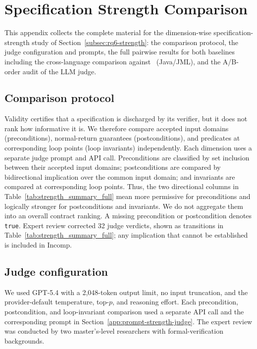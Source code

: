 \section{{Specification Strength Comparison}}
\label{app:strength}

{This appendix collects the complete material for the dimension-wise specification-strength study of Section~\ref{subsec:rq6-strength}: the comparison protocol, the judge configuration and prompts, the full pairwise results for both baselines including the cross-language comparison against \specgen\ (Java/JML), and the A/B-order audit of the LLM judge.}

\subsection{{Comparison protocol}}
\label{app:strength-protocol}

{Validity certifies that a specification is discharged by its verifier, but it does not rank how informative it is. We therefore compare accepted input domains (preconditions), normal-return guarantees (postconditions), and predicates at corresponding loop points (loop invariants) independently. Each dimension uses a separate judge prompt and API call. Preconditions are classified by set inclusion between their accepted input domains; postconditions are compared by bidirectional implication over the common input domain; and invariants are compared at corresponding loop points. Thus, the two directional columns in Table~\ref{tab:strength_summary_full} mean more permissive for preconditions and logically stronger for postconditions and invariants. We do not aggregate them into an overall contract ranking. A missing precondition or postcondition denotes \texttt{true}. Expert review corrected 32 judge verdicts, shown as transitions in Table~\ref{tab:strength_summary_full}; any implication that cannot be established is included in Incomp.}

\subsection{{Judge configuration}}
\label{app:judge-config}

{We used GPT-5.4 with a 2,048-token output limit, no input truncation, and the provider-default temperature, top-$p$, and reasoning effort. Each precondition, postcondition, and loop-invariant comparison used a separate API call and the corresponding prompt in Section~\ref{app:prompt-strength-judge}. The expert review was conducted by two master's-level researchers with formal-verification backgrounds.}

